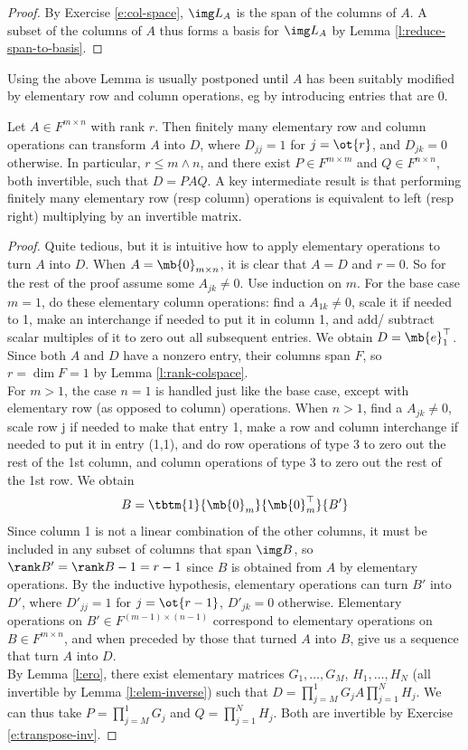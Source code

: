 \begin{proof}%
By Exercise \ref{e:col-space}, $\img L_A$ is the span of the columns of $A$. A subset of the columns of $A$ thus forms a basis for $\img L_A$ by Lemma \ref{l:reduce-span-to-basis}.
\end{proof}
Using the above Lemma is usually postponed until $A$ has been suitably modified by elementary row and column operations, eg by introducing entries that are 0. 
\begin{lem}\label{l:rank-diag}
Let $A \in F^{m \times n}$ with rank $r$. Then finitely many elementary row and column operations can transform $A$ into $D$, where $D_{jj}=1$ for $j=\ot{r}$, and $D_{jk}=0$ otherwise. In particular, $r \leq m \wedge n$, and there exist $P \in F^{m \times m}$ and $Q \in F^{n \times n}$, both invertible, such that $D=PAQ$. A key intermediate result is that performing finitely many elementary row (resp column) operations is equivalent to left (resp right) multiplying by an invertible matrix.
\end{lem}
\begin{proof}
Quite tedious, but it is intuitive how to apply elementary operations to turn $A$ into $D$. When $A=\mb{0}_{m \times n}$, it is clear that $A=D$ and $r=0$. So for the rest of the proof assume some $A_{jk}\neq 0$. Use induction on $m$. For the base case $m=1$, do these elementary column operations: find a $A_{1k}\neq 0$, scale it if needed to 1, make an interchange if needed to put it in column 1, and add/ subtract scalar multiples of it to zero out all subsequent entries. We obtain $D= \mb{e}_1^\top$. Since both $A$ and $D$ have a nonzero entry, their columns span $F$, so $r=\dim F=1$ by Lemma \ref{l:rank-colspace}.\\
For $m>1$, the case $n=1$ is handled just like the base case, except with elementary row (as opposed to column) operations. When $n>1$, find a $A_{jk}\neq 0$, scale row j if needed to make that entry 1, make a row and column interchange if needed to put it in entry (1,1), and do row operations of type 3 to zero out the rest of the 1st column, and column operations of type 3 to zero out the rest of the 1st row. We obtain
\[ B=\tbtm{1}{\mb{0}_m}{\mb{0}_m^\top}{B'}\]
Since column 1 is not a linear combination of the other columns, it must be included in any subset of columns that span $\img B$, so $\rank B'= \rank B-1=r-1$ since $B$ is obtained from $A$ by elementary operations. By the inductive hypothesis, elementary operations can turn $B'$ into $D'$, where $D'_{jj}=1$ for $j=\ot{r-1}$, $D'_{jk}=0$ otherwise. Elementary operations on $B' \in F^{(m-1) \times (n-1)}$ correspond to elementary operations on $B \in F^{m \times n}$, and when preceded by those that turned $A$ into $B$, give us a sequence that turn $A$ into $D$.\\
By Lemma \ref{l:ero}, there exist elementary matrices $G_1, \ldots,G_M$, $H_1, \ldots,H_N$ (all invertible by Lemma \ref{l:elem-inverse}) such that $D= \prod_{j=M}^1G_jA \prod_{j=1}^NH_j$. We can thus take $P=\prod_{j=M}^1G_j$ and $Q=\prod_{j=1}^NH_j$. Both are invertible by Exercise \ref{e:transpose-inv}.
\end{proof}
